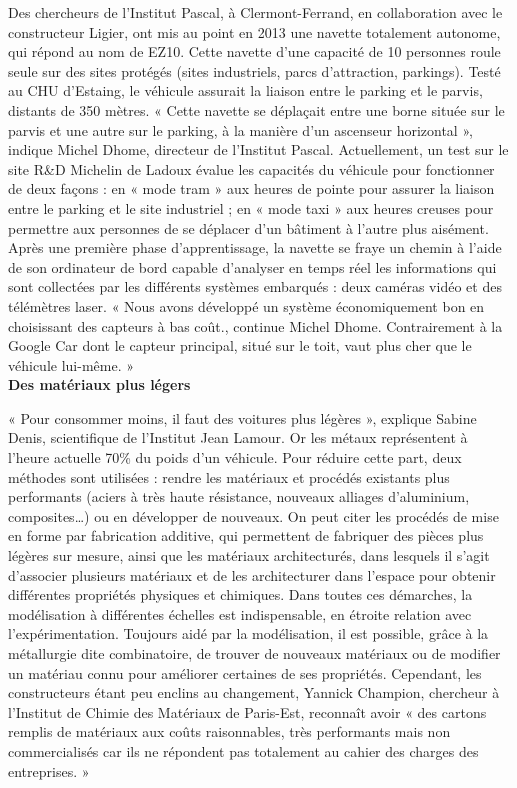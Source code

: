 \documentclass[8pt]{article}
\begin{document}
Des chercheurs de l’Institut Pascal, à Clermont-Ferrand, en collaboration avec le constructeur Ligier, ont mis au point en 2013 une navette totalement autonome, qui répond au nom de EZ10. Cette navette d’une capacité de 10 personnes roule seule sur des sites protégés (sites industriels, parcs d’attraction, parkings). Testé au CHU d’Estaing, le véhicule assurait la liaison entre le parking et le parvis, distants de 350 mètres. « Cette navette se déplaçait entre une borne située sur le parvis et une autre sur le parking, à la manière d’un ascenseur horizontal », indique Michel Dhome, directeur de l’Institut Pascal. Actuellement, un test sur le site R\&D Michelin de Ladoux évalue les capacités du véhicule pour fonctionner de deux façons : en « mode tram » aux heures de pointe pour assurer la liaison entre le parking et le site industriel ; en « mode taxi » aux heures creuses pour permettre aux personnes de se déplacer d’un bâtiment à l’autre plus aisément. Après une première phase d’apprentissage, la navette se fraye un chemin à l’aide de son ordinateur de bord capable d’analyser en temps réel les informations qui sont collectées par les différents systèmes embarqués : deux caméras vidéo et des télémètres laser. « Nous avons développé un système économiquement bon en choisissant des capteurs à bas coût., continue Michel Dhome. Contrairement à la Google Car dont le capteur principal, situé sur le toit, vaut plus cher que le véhicule lui-même. »\\
 

\textbf{Des matériaux plus légers}

« Pour consommer moins, il faut des voitures plus légères », explique Sabine Denis, scientifique de l'Institut Jean Lamour. Or les métaux représentent à l'heure actuelle 70\% du poids d'un véhicule. Pour réduire cette part, deux méthodes sont utilisées : rendre les matériaux et procédés existants plus performants (aciers à très haute résistance, nouveaux alliages d’aluminium, composites…) ou en développer de nouveaux. On peut citer les procédés de mise en forme par fabrication additive, qui permettent de fabriquer des pièces plus légères sur mesure, ainsi que les matériaux architecturés, dans lesquels il s’agit d’associer plusieurs matériaux et de les architecturer dans l’espace pour obtenir différentes propriétés physiques et chimiques. Dans toutes ces démarches, la modélisation à différentes échelles est indispensable, en étroite relation avec l’expérimentation. Toujours aidé par la modélisation, il est possible, grâce à la métallurgie dite combinatoire, de trouver de nouveaux matériaux ou de modifier un matériau connu pour améliorer certaines de ses propriétés. Cependant, les constructeurs étant peu enclins au changement, Yannick Champion, chercheur à l’Institut de Chimie des Matériaux de Paris-Est, reconnaît avoir « des cartons remplis de matériaux aux coûts raisonnables, très performants mais non commercialisés car ils ne répondent pas totalement au cahier des charges des entreprises. » \\
\end{document}
